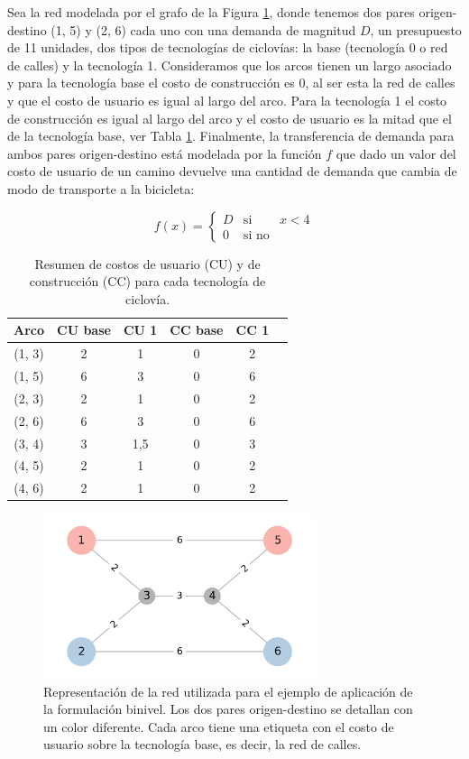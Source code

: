 Sea la red modelada por el grafo de la Figura \ref{fig:example1base}, donde tenemos dos pares origen-destino (1, 5) y (2, 6) cada uno con una demanda de magnitud $D$, un presupuesto de 11 unidades, dos tipos de tecnologías de ciclovías: la base (tecnología 0 o red de calles) y la tecnología 1. Consideramos que los arcos tienen un largo asociado y para la tecnología base el costo de construcción es 0, al ser esta la red de calles y que el costo de usuario es igual al largo del arco. Para la tecnología 1 el costo de construcción es igual al largo del arco y el costo de usuario es la mitad que el de la tecnología base, ver Tabla \ref{table:example1arccosts}. Finalmente, la transferencia de demanda para ambos pares origen-destino está modelada por la función $f$ que dado un valor del costo de usuario de un camino devuelve una cantidad de demanda que cambia de modo de transporte a la bicicleta:

$$
  f(x) = \left\{ \begin{array}{lcr}
          D & \mbox{si}    & x < 4 \\
          0 & \mbox{si no} &
  \end{array}
  \right.
$$

\begin{table}[h!]
  \centering
  \begin{tabular}{cccccc}
    \toprule
    Arco & CU base & CU 1 & CC base & CC 1 & \\
    \midrule
      (1, 3) & 2 & 1   & 0 & 2 \\
      (1, 5) & 6 & 3   & 0 & 6 \\
      (2, 3) & 2 & 1   & 0 & 2 \\
      (2, 6) & 6 & 3   & 0 & 6 \\
      (3, 4) & 3 & 1,5 & 0 & 3 \\
      (4, 5) & 2 & 1   & 0 & 2 \\
      (4, 6) & 2 & 1   & 0 & 2 \\
    \bottomrule
  \end{tabular}
    \caption{Resumen de costos de usuario (CU) y de construcción (CC) para cada tecnología de ciclovía.}\label{table:example1arccosts}
\end{table}

\begin{figure}[h!]
  \centering
  \includegraphics[width=8cm]{../resources/example_1_base.png}
  \caption{Representación de la red utilizada para el ejemplo de aplicación de la formulación binivel. Los dos pares origen-destino se detallan con un color diferente. Cada arco tiene una etiqueta con el costo de usuario sobre la tecnología base, es decir, la red de calles.}
  \label{fig:example1base}
\end{figure}

